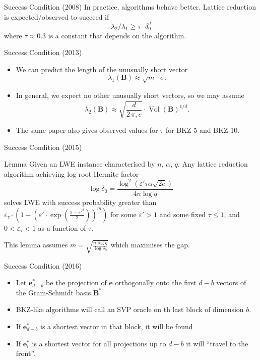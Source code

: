 \documentclass[presentation,smaller]{beamer}
\renewcommand{\vec}[1]{\mathbf{#1}\xspace}
\newcommand{\mat}[1]{\mathbf{#1}\xspace}
\DeclareMathOperator{\Vol}{Vol}
\begin{document}
\begin{frame}[label={sec:orgd2325ca}]{Success Condition (2008)}
In practice, algorithms behave better. Lattice reduction is expected/observed  to succeed if \[λ_2/λ_1 ≥ τ ⋅ δ_0^d\] where \(τ ≈ 0.3\) is a constant that depends on the algorithm.
\end{frame}

\begin{frame}[label={sec:orgb5a86c2}]{Success Condition (2013)}
\begin{itemize}
\item We can predict the length of the unusually short vector \[λ_1(\vec{B}) ≈ \sqrt{m} ⋅ σ.\]

\item In general, we expect no other unusually short vectors, so we may assume  \[λ_2(\vec{B}) ≈ \sqrt{\frac{d}{2\,π,e}} ⋅ \Vol(\vec{B})^{1/d}.\]

\item The same paper also gives observed values for \(τ\) for BKZ-5 and BKZ-10.
\end{itemize}
\end{frame}

\begin{frame}[label={sec:org0920913}]{Success Condition (2015)}
\begin{block}{Lemma }
Given an LWE instance characterised by \(n\), \(α\), \(q\). Any lattice reduction algorithm achieving log root-Hermite factor \[\log{δ_0} = \frac{\log^2{\left(ε' τ α \sqrt{2e}\right)}}{4 n \log{q}}\] solves LWE with success probability greater than \(ε_τ ⋅ \left( 1-\left(ε' ⋅  \exp{\left(\frac{1-ε'^2}{2}\right)}\right)^m \right)\) for some \(ε' > 1\) and some fixed \(τ ≤ 1\), and \(0 < ε_τ < 1\) as a function of \(τ\).
\end{block}

This lemma assumes \(m = \sqrt{\frac{n \log q}{\log δ_0}}\) which maximises the gap.
\end{frame}

\begin{frame}[label={sec:orge3aa4e1}]{Success Condition (2016)}
\begin{itemize}
\item Let \(\vec{e}^*_{d-b}\) be the projection of \(\vec{e}\) orthogonally onto the first \(d-b\) vectors of the Gram-Schmidt basis \(\mat{B}^*\)
\item BKZ-like algorithms will call an SVP oracle on th last block of dimension \(b\).
\item If \(\vec{e}^*_{d-b}\) is a shortest vector in that block, it will be found
\item If \(\vec{e}^*_i\) is a shortest vector for all projections up to \(d-b\) it will “travel to the front”.
\end{itemize}
\end{frame}
\end{document}
